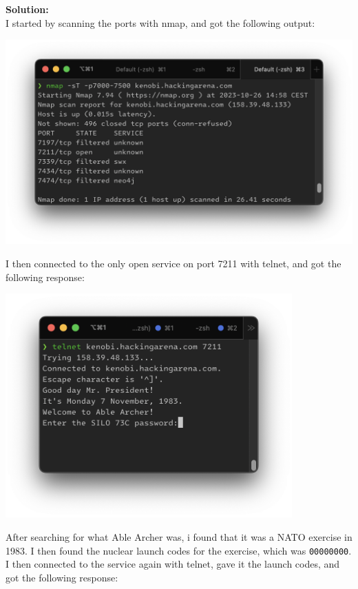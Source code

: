 \textbf{Solution:}\\
I started by scanning the ports with nmap, and got the following output:

\begin{center}
    \includegraphics[width=14cm]{img/Get in touch with services/Minuteman/Skjermbilde 2023-10-26 kl. 15.14.45.png}
\end{center}

I then connected to the only open service on port 7211 with telnet, and got the following response:

\begin{center}
    \includegraphics[width=11cm]{img/Get in touch with services/Minuteman/Skjermbilde 2023-10-27 kl. 09.30.39.png}
\end{center}

After searching for what Able Archer was, i found that it was a NATO exercise in 1983. I then found the nuclear launch codes for the exercise, which was \texttt{00000000}. I then connected to the service again with telnet, gave it the launch codes, and got the following response:


